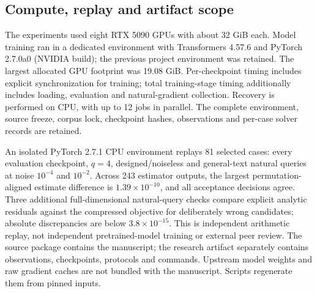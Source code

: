 \subsection{Compute, replay and artifact scope}



The experiments used eight RTX 5090 GPUs with about 32 GiB each. Model
 training ran in a dedicated environment with Transformers 4.57.6 and
PyTorch 2.7.0a0 (NVIDIA build); the previous project environment was retained.
The largest allocated GPU footprint was 19.08 GiB. Per-checkpoint timing
 includes explicit synchronization for training; total training-stage
 timing additionally includes loading, evaluation and natural-gradient
 collection. Recovery is performed on CPU, with up to 12 jobs in parallel.
The complete environment, source freeze, corpus lock, checkpoint hashes,
 observations and per-case solver records are retained.

An isolated PyTorch 2.7.1 CPU environment replays 81 selected cases:
 every evaluation checkpoint, $q=4$, designed/noiseless and general-text
 natural queries at noise $10^{-4}$ and $10^{-2}$. Across 243 estimator
 outputs, the largest permutation-aligned estimate difference is
$1.39\times10^{-10}$, and all acceptance decisions agree. Three additional
 full-dimensional natural-query checks compare explicit analytic residuals
 against the compressed objective for deliberately wrong candidates;
 absolute discrepancies are below $3.8\times10^{-15}$. This is independent
 arithmetic replay, not independent pretrained-model training or external
 peer review. The source package contains the manuscript; the research
 artifact separately contains observations, checkpoints, protocols and
 commands. Upstream model weights and raw gradient caches are not bundled
 with the manuscript. Scripts regenerate them from pinned inputs.
